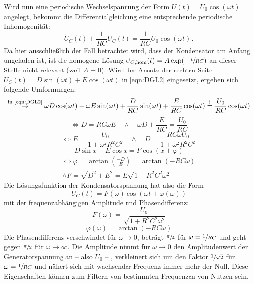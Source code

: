 Wird nun eine periodische Wechselspannung der Form $U(t)=U_0\cos(\omega t)$ angelegt, bekommt die Differentialgleichung 
eine entsprechende periodische Inhomogenität:
\begin{equation}
    \dot{U}_C(t) + \frac{1}{RC}U_C(t) = \frac{1}{RC}U_0 \cos(\omega t)\,.
    \label{eqn:DGL2}
\end{equation}
Da hier ausschließlich der Fall betrachtet wird, dass der Kondensator am Anfang ungeladen ist, ist die homogene Lösung 
$U_{C\text{,hom}}(t)=A\exp(\sfrac{-t}{RC})$ an dieser Stelle nicht relevant (weil ${A=0}$). 
Wird der Ansatz der rechten Seite ${U_C(t)=D\sin(\omega t) + E\cos(\omega t)}$ in \eqref{eqn:DGL2} eingesetzt, ergeben sich folgende Umformungen: 
\begin{equation}
    \stackrel{\text{in \eqref{eqn:DGL2}}}{\to} \omega D\cos(\omega t)-\omega E\sin(\omega t) + 
    \frac{D}{RC}\sin(\omega t) + \frac{E}{RC}\cos(\omega t) \stackrel{!}{=} \frac{U_0}{RC}\cos(\omega t)
\end{equation}
\begin{equation}
    \Leftrightarrow D=RC\omega E \quad \land \quad
    \omega D + \frac{E}{RC} = \frac{U_0}{RC}
\end{equation}
\begin{equation}
    \Leftrightarrow E=\frac{U_0}{1+\omega^2R^2C^2} \quad \land \quad D=\frac{RC\omega U_0}{1+\omega^2R^2C^2}
\end{equation}
\begin{equation}
    D\sin x + E\cos x = F\cos(x+\varphi)
\end{equation}
\begin{gather}
    \Leftrightarrow \varphi=\arctan(\frac{-D}{E}) = \arctan(-RC\omega)  \\
    \land F=\sqrt{D^2+E^2}=E\sqrt{1+R^2C^2\omega^2}
\end{gather}
Die Lösungsfunktion der Kondensatorspannung hat also die Form 
\begin{equation}
    U_C(t)=F(\omega)\cos(\omega t +\varphi(\omega))
    \label{eqn:U_C_AC}
\end{equation}
mit der frequenzabhängigen Amplitude und Phasendifferenz:
\begin{equation}
    F(\omega)=\frac{U_0}{\sqrt{1+R^2C^2\omega ^2}}
    \label{eqn:ampl_omega}
\end{equation}
\begin{equation}
    \varphi(\omega)=\arctan(-RC\omega)
    \label{eqn:phas_diff_omega}
\end{equation}
Die Phasendifferenz verschwindet für ${\omega \to 0}$, beträgt $\sfrac{\pi}{4}$ für ${\omega=\sfrac{1}{RC}}$ und geht gegen 
$\sfrac{\pi}{2}$ für ${\omega \to \infty}$. 
Die Amplitude nimmt für ${\omega \to 0}$ den Amplitudenwert der Generatorspannung an -- also $U_0$ -- , verkleinert sich 
um den Faktor $\sfrac{1}{\sqrt{2}}$ für ${\omega = \sfrac{1}{RC}}$ und nähert sich mit wachsender Frequenz immer mehr der Null. 
Diese Eigenschaften können zum Filtern von bestimmten Frequenzen von Nutzen sein. 
\FloatBarrier


